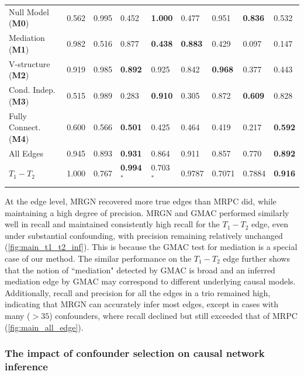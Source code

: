 \documentclass[12pt,letterpaper]{report}
\begin{document}
\begin{doublespace}
\begin{table}[H]
\begin{tabular}{l|ll|ll|ll|ll}
		\midrule[0.04cm]
		Null Model ({\bf M0}) & 0.562  & 0.995  & 0.452  & \bf 1.000  & 0.477  & 0.951  & \bf 0.836  & 0.532  \\
		Mediation ({\bf M1}) & 0.982  & 0.516  & 0.877 & \bf 0.438  & \bf 0.883  & 0.429  & 0.097  & 0.147  \\
		V-structure ({\bf M2}) & 0.919  & 0.985  & \bf 0.892  & 0.925  & 0.842  & \bf 0.968  & 0.377  & 0.443  \\ 
		Cond. Indep. ({\bf M3}) & 0.515  & 0.989  & 0.283  & \bf 0.910  & 0.305  & 0.872  & \bf 0.609  & 0.828  \\ 
		Fully Connect. ({\bf M4}) & 0.600  & 0.566  & \bf 0.501  & 0.425  & 0.464  & 0.419  & 0.217  & \bf 0.592  \\ 
		All Edges  & 0.945  & 0.893  & \bf 0.931  & 0.864  & 0.911  & 0.857  & 0.770  & \bf 0.892  \\
		$T_1-T_2$ & 1.000  & 0.767  & \bf 0.994$^*$  & 0.703$^*$  & 0.9787 & 0.7071 & 0.7884 & \bf 0.916 \\
		\bottomrule
	\end{tabular}
	\label{tab:results}
\end{table}

At the edge level, MRGN recovered more true edges than MRPC did, while maintaining a high degree of precision. 
MRGN and GMAC performed similarly well in recall and maintained consistently high recall for the $T_1 - T_2$ edge, even under substantial confounding, with precision remaining relatively unchanged (\autoref{fig:main_t1_t2_inf}). This is because the GMAC test for mediation is a special case of our method. The similar performance on the $T_1 - T_2$ edge further shows that the notion of ``mediation" detected by GMAC is broad and an inferred mediation edge by GMAC may correspond to different underlying causal models.  Additionally, recall and precision for all the edges in a trio remained high, indicating that MRGN can accurately infer most edges, except in cases with many ($>35$) confounders, where recall declined but still exceeded that of MRPC (\autoref{fig:main_all_edge}).

\subsubsection*{The impact of confounder selection on causal network inference}


\end{doublespace}
\end{document}
